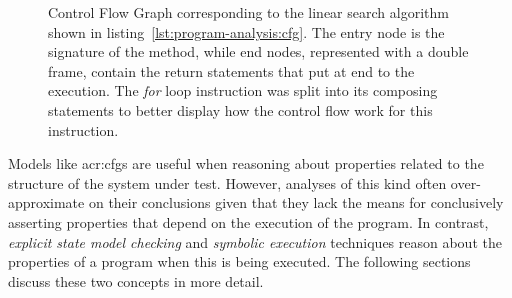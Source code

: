 \begin{figure}[t]
\centering
{}
\caption[Control Flow Graph of the linear search algorithm]{Control Flow Graph corresponding to the linear search algorithm shown in listing~\ref{lst:program-analysis:cfg}. The entry node is the signature of the method, while end nodes, represented with a double frame, contain the return statements that put at end to the execution. The \textit{for} loop instruction was split into its composing statements to better display how the control flow work for this instruction.}
\label{fig:program-analysis:cfg}
\end{figure}

Models like \acrshort{acr:cfg}s are useful when reasoning about properties related to the structure of the system under test. However, analyses of this kind often over-approximate on their conclusions given that they lack the means for conclusively asserting properties that depend on the execution of the program. In contrast, \textit{explicit state model checking} and \textit{symbolic execution} techniques reason about the properties of a program when this is being executed. The following sections discuss these two concepts in more detail.


